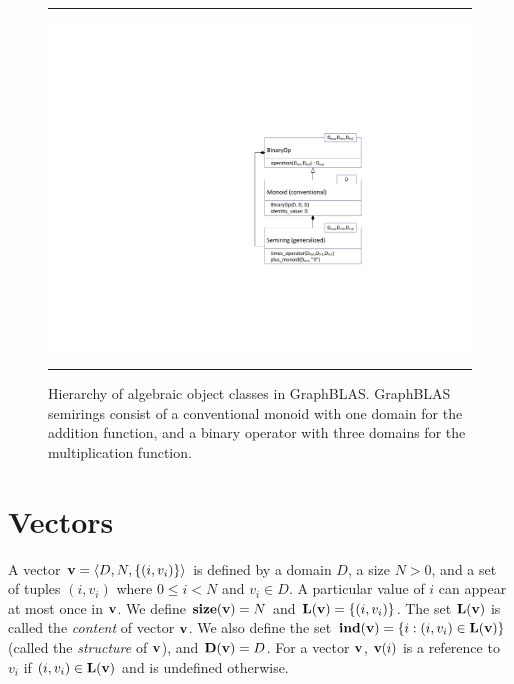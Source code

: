\begin{figure}[htb]
    \hrule
    \begin{center}
        \includegraphics[width=1.0\linewidth,trim=3in 2in 0.5in 2in]{Algebra_Hierarchy_v2_1.pdf}
    \end{center}
    \caption{Hierarchy of algebraic object classes in GraphBLAS. GraphBLAS 
    semirings consist of a conventional monoid with one domain for the addition 
    function, and a binary operator with three domains for the multiplication function.}
    \label{Fig:AlgebraHierarchy}
    \hrule
\end{figure}

\section{Vectors}
\label{Sec:Vectors}

A vector ${\bf v} = \langle D, N, \{ (i,v_i) \} \rangle$ is defined by
a domain $D$, a size $N>0$, and a set of tuples $(i,v_i)$ where $0 \leq
i < N$ and $v_i \in D$. A particular value of $i$ can appear at
most once in ${\bf v}$. We define $\mathbf{size}({\bf v}) = N$ and
$\mathbf{L}({\bf v}) = \{ (i,v_i) \}$. The set $\mathbf{L}({\bf v})$ is
called the \emph{content} of vector ${\bf v}$. We also define the set
${\bf ind({\bf v})} = \{ i : (i,v_i) \in \mathbf{L}({\bf v}) \}$
(called the \emph{structure} of ${\bf v}$), and $\mathbf{D}({\bf v})
= D$. For a vector ${\bf v}$, ${\bf v}(i)$ is a reference to $v_i$
if $(i,v_i) \in \mathbf{L}({\bf v})$ and is undefined otherwise.

